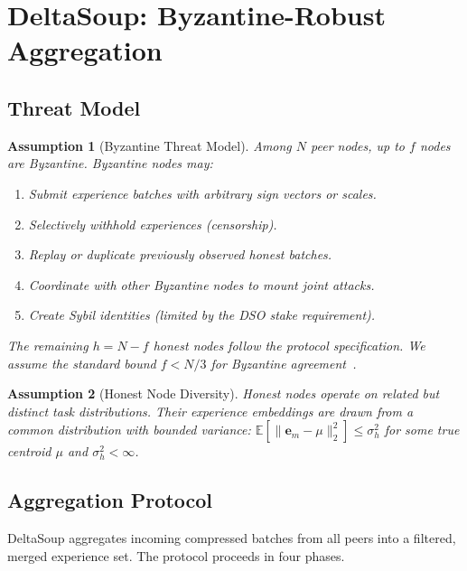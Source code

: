 \documentclass[11pt]{article}
\newtheorem{assumption}{Assumption}
\begin{document}
\section{DeltaSoup: Byzantine-Robust Aggregation}
\label{sec:deltasoup}

\subsection{Threat Model}

\begin{assumption}[Byzantine Threat Model]
\label{ass:threat}
Among $N$ peer nodes, up to $f$ nodes are Byzantine. Byzantine nodes may:
\begin{enumerate}[leftmargin=1.5em]
    \item Submit experience batches with arbitrary sign vectors or scales.
    \item Selectively withhold experiences (censorship).
    \item Replay or duplicate previously observed honest batches.
    \item Coordinate with other Byzantine nodes to mount joint attacks.
    \item Create Sybil identities (limited by the DSO stake requirement).
\end{enumerate}
The remaining $h = N - f$ honest nodes follow the protocol specification.
We assume the standard bound $f < N/3$ for Byzantine agreement~\cite{pease1980reaching}.
\end{assumption}

\begin{assumption}[Honest Node Diversity]
\label{ass:diversity}
Honest nodes operate on related but distinct task distributions. Their
experience embeddings are drawn from a common distribution with bounded
variance: $\mathbb{E}[\|\bm{e}_m - \mu\|_2^2] \leq \sigma_h^2$ for some
true centroid $\mu$ and $\sigma_h^2 < \infty$.
\end{assumption}

\subsection{Aggregation Protocol}

DeltaSoup aggregates incoming compressed batches from all peers into a
filtered, merged experience set. The protocol proceeds in four phases.
\end{document}
